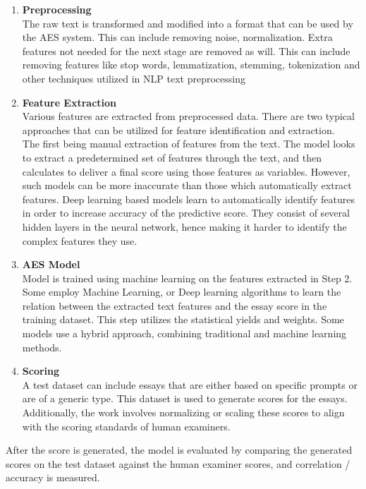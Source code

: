 \documentclass{article}
\begin{document}
	\begin{enumerate}
		\item \textbf{Preprocessing} \\ The raw text is transformed and modified into a format that can be used by the AES system. This can include removing noise, normalization. Extra features not needed for the next stage are removed as will. This can include removing features like stop words, lemmatization, stemming, tokenization and other techniques utilized in NLP text preprocessing
		
		\item \textbf{Feature Extraction} \\ Various features are extracted from preprocessed data. There are two typical approaches that can be utilized for feature identification and extraction. \\ The first being manual extraction of features from the text. The model looks to extract a predetermined set of features through the text, and then calculates to deliver a final score using those features as variables. However, such models can be more inaccurate than those which automatically extract features. Deep learning based models learn to automatically identify features in order to increase accuracy of the predictive score. They consist of several hidden layers in the neural network, hence making it harder to identify the complex features they use.
		
		\item \textbf{AES Model} \\ Model is trained using machine learning on the features extracted in Step 2. Some employ  Machine Learning, or Deep learning algorithms to learn the relation between the extracted text features and the essay score in the training dataset. This step utilizes the statistical yields and weights. Some models use a hybrid approach, combining traditional and machine learning methods.
		\item \textbf{Scoring} \\ A test dataset can include essays that are either based on specific prompts or are of a generic type. This dataset is used to generate scores for the essays. Additionally, the work involves normalizing or scaling these scores to align with the scoring standards of human examiners.
	\end{enumerate}
	After the score is generated, the model is evaluated by comparing the generated scores on the test dataset against the human examiner scores, and correlation / accuracy is measured.
\end{document}

